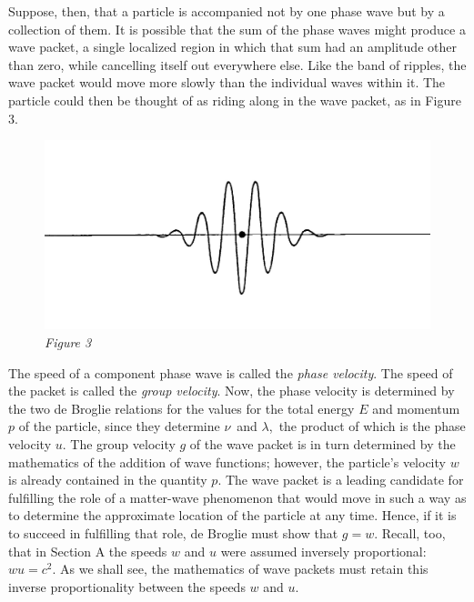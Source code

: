 Suppose, then, that a particle is accompanied not by one phase wave but
by a collection of them. It is possible that the sum of the phase waves
might produce a wave packet, a single localized region in which that sum
had an amplitude other than zero, while cancelling itself out everywhere
else. Like the band of ripples, the wave packet would move more slowly
than the individual waves within it. The particle could then be thought
of as riding along in the wave packet, as in Figure 3.
\vspace*{-10pt}
\begin{figure}[h] %
\centering
    \includegraphics[width=.7\textwidth,height=.34436\textwidth]{images/08_debroglie/pilot.jpg}
    \vspace*{-10pt}
  \caption*{\emph{Figure 3}}
\end{figure}

The speed of a component phase wave is called the \emph{phase velocity}.
The speed of the packet is called the \emph{group velocity}. Now, the
phase velocity is determined by the two de Broglie relations for the
values for the total energy $E$ and momentum $p$ of the
particle, since they determine $\nu$~and $\lambda$,~the product of
which is the phase velocity $u$. The group velocity $g$ of the
wave packet is in turn determined by the mathematics of the addition of
wave functions; however, the particle's velocity $w$ is already
contained in the quantity $p$. The wave packet is a leading
candidate for fulfilling the role of a matter-wave phenomenon that would
move in such a way as to determine the approximate location of the
particle at any time. Hence, if it is to succeed in fulfilling that
role, de Broglie must show that $g = w$. Recall, too, that
in Section A the speeds $w$ and $u$ were assumed inversely
proportional: $wu = c^2$. As we shall see, the mathematics of
wave packets must retain this inverse proportionality between the speeds
$w$ and $u$.

